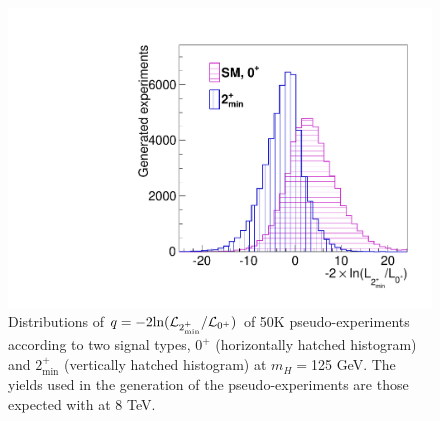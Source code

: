 \begin{figure}[!hbtp]
\centering
\label{subfig:res}
\includegraphics[width=.7\textwidth]{figures/hypo_separation.pdf}
\caption{Distributions of 
$q=-2\text{ln}({\cal L}_{2_\text{min}^+}/{\cal L}_{\text{0}^+})$ 
of 50K pseudo-experiments according to two signal types, $0^+$ (horizontally hatched histogram) 
and $2_\text{min}^+$ (vertically hatched histogram) at $m_H=$125 GeV. 
The yields used in the generation of the pseudo-experiments are those 
expected with \intlumiEightTeV at 8 TeV. 
}
\label{fig:expsep}
\end{figure}

